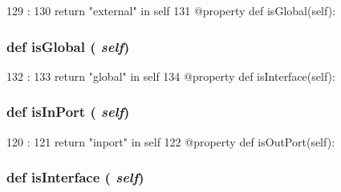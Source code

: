 \begin{DoxyCode}
129                         :
130         return "external" in self
131     @property
    def isGlobal(self):
\end{DoxyCode}
\hypertarget{classslicc_1_1symbols_1_1Type_1_1Type_ac99cb31b54c2509026d0986ed8cee4b0}{
\subsubsection[{isGlobal}]{\setlength{\rightskip}{0pt plus 5cm}def isGlobal ( {\em self})}}
\label{classslicc_1_1symbols_1_1Type_1_1Type_ac99cb31b54c2509026d0986ed8cee4b0}



\begin{DoxyCode}
132                       :
133         return "global" in self
134     @property
    def isInterface(self):
\end{DoxyCode}
\hypertarget{classslicc_1_1symbols_1_1Type_1_1Type_a4ecffdf0fe4cb90efbaa76c057a77741}{
\subsubsection[{isInPort}]{\setlength{\rightskip}{0pt plus 5cm}def isInPort ( {\em self})}}
\label{classslicc_1_1symbols_1_1Type_1_1Type_a4ecffdf0fe4cb90efbaa76c057a77741}



\begin{DoxyCode}
120                       :
121         return "inport" in self
122     @property
    def isOutPort(self):
\end{DoxyCode}
\hypertarget{classslicc_1_1symbols_1_1Type_1_1Type_aaf86a09de159b229b176e309e7435eaf}{
\subsubsection[{isInterface}]{\setlength{\rightskip}{0pt plus 5cm}def isInterface ( {\em self})}}
\label{classslicc_1_1symbols_1_1Type_1_1Type_aaf86a09de159b229b176e309e7435eaf}



